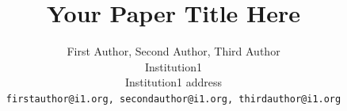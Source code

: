 \documentclass[10pt,twocolumn,letterpaper]{article}
\title{Your Paper Title Here}
\author{First Author, Second Author, Third Author\\
Institution1\\
Institution1 address\\
{\tt\small firstauthor@i1.org, secondauthor@i1.org, thirdauthor@i1.org}
}
\begin{document}
\maketitle
    



{
    \small
    
    
}

% 
\end{document}
